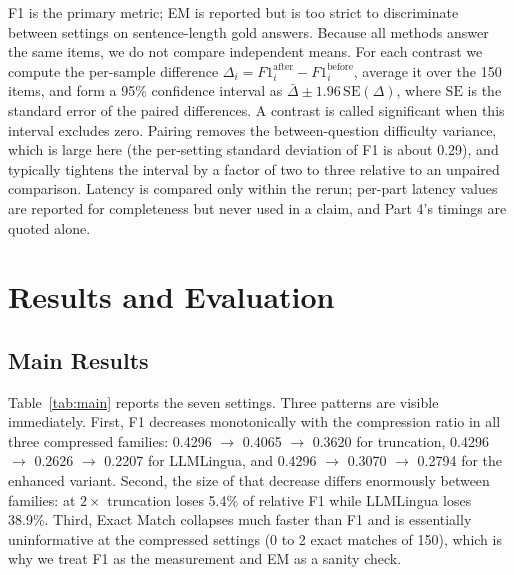 \documentclass[10pt,a4paper,twocolumn]{article}
\begin{document}
F1 is the primary metric; EM is reported but is too strict to discriminate
between settings on sentence-length gold answers. Because all methods answer the
same items, we do not compare independent means. For each contrast we compute the
per-sample difference $\Delta_i = F1^{\text{after}}_i - F1^{\text{before}}_i$,
average it over the 150 items, and form a 95\% confidence interval as
$\bar{\Delta} \pm 1.96\,\mathrm{SE}(\Delta)$, where $\mathrm{SE}$ is the standard
error of the paired differences. A contrast is called significant when this
interval excludes zero. Pairing removes the between-question difficulty variance,
which is large here (the per-setting standard deviation of F1 is about 0.29), and
typically tightens the interval by a factor of two to three relative to an
unpaired comparison. Latency is compared only within the rerun; per-part latency
values are reported for completeness but never used in a claim, and Part 4's
timings are quoted alone.

\section{Results and Evaluation}

\subsection{Main Results}

Table~\ref{tab:main} reports the seven settings. Three patterns are visible
immediately. First, F1 decreases monotonically with the compression ratio in all
three compressed families: 0.4296 $\rightarrow$ 0.4065 $\rightarrow$ 0.3620 for
truncation, 0.4296 $\rightarrow$ 0.2626 $\rightarrow$ 0.2207 for LLMLingua, and
0.4296 $\rightarrow$ 0.3070 $\rightarrow$ 0.2794 for the enhanced variant. Second,
the size of that decrease differs enormously between families: at $2\times$
truncation loses 5.4\% of relative F1 while LLMLingua loses 38.9\%. Third, Exact
Match collapses much faster than F1 and is essentially uninformative at the
compressed settings (0 to 2 exact matches of 150), which is why we treat F1 as the
measurement and EM as a sanity check.
\end{document}
